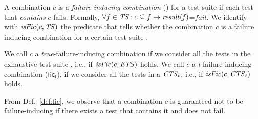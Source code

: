 \begin{tikzborder}{\cite{Gargantini16:validation}}
\begin{tikzborder}{\cite{gargantini_combinatorial_2017}}
\begin{tikzborder}{\cite{gargantini_combinatorial_2017}}
\begin{tikzborder}{\cite{garn2019}}
\begin{tikzborder}{\cite{arcaini2019achieving}}
\begin{tikzborder}{}
\begin{defn}\label{def:fic}
	A combination $c$ is a {\it failure-inducing combination} (\fic) for a test suite \ts if each test that \emph{contains} $c$ fails. Formally, $\forall f \in \mathit{TS} \colon c \subseteq f \rightarrow \mathit{\mathit{result}(f)}$=$\textit{fail}$. We identify with $\mathit{isFic}(c,\mathit{TS})$ the predicate that tells whether the combination $c$ is a failure inducing combination for a certain test suite \ts.
	
	We call $c$ a \textit{true}-failure-inducing combination if we consider all the tests in the exhaustive test suite \ets, i.e., if $\mathit{isFic}(c, \mathit{ETS})$ holds. We call $c$ a \textit{t}-failure-inducing combination ($\mathsf{fic_t}$), if we consider all the tests in a $\mathit{CTS}_t$, i.e., if $\mathit{isFic}(c, \mathit{CTS}_t)$ holds.
\end{defn}

\begin{observation}\label{obs:notFailureInd}
	From Def.~\ref{def:fic}, we observe that a combination $c$ is guaranteed not to be failure-inducing if there exists a test that contains it and does not fail.
\end{observation}
\end{tikzborder}


\end{tikzborder}
\end{tikzborder}
\end{tikzborder}
\end{tikzborder}
\end{tikzborder}
